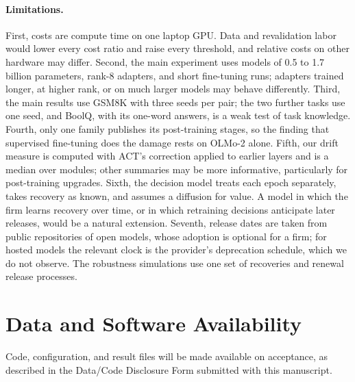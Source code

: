 \documentclass[ijds,blindrev]{informs4}
\begin{document}
\paragraph{Limitations.} First, costs are compute time on one laptop GPU. Data and revalidation labor would lower every cost ratio and raise every threshold, and relative costs on other hardware may differ. Second, the main experiment uses models of 0.5 to 1.7 billion parameters, rank-8 adapters, and short fine-tuning runs; adapters trained longer, at higher rank, or on much larger models may behave differently. Third, the main results use GSM8K with three seeds per pair; the two further tasks use one seed, and BoolQ, with its one-word answers, is a weak test of task knowledge. Fourth, only one family publishes its post-training stages, so the finding that supervised fine-tuning does the damage rests on OLMo-2 alone. Fifth, our drift measure is computed with ACT's correction applied to earlier layers and is a median over modules; other summaries may be more informative, particularly for post-training upgrades. Sixth, the decision model treats each epoch separately, takes recovery as known, and assumes a diffusion for value. A model in which the firm learns recovery over time, or in which retraining decisions anticipate later releases, would be a natural extension. Seventh, release dates are taken from public repositories of open models, whose adoption is optional for a firm; for hosted models the relevant clock is the provider's deprecation schedule, which we do not observe. The robustness simulations use one set of recoveries and renewal release processes.

\section*{Data and Software Availability}
Code, configuration, and result files will be made available on acceptance, as described in the Data/Code Disclosure Form submitted with this manuscript.
\end{document}

